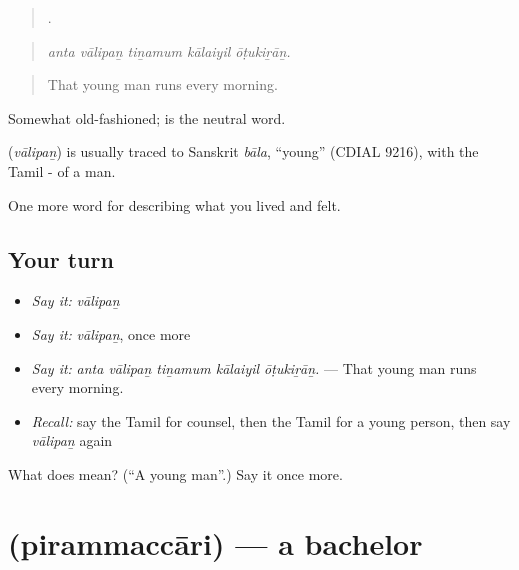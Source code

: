 \begin{quote}
    .
\end{quote}

\begin{quote}
\emph{anta vālipaṉ tiṉamum kālaiyil ōṭukiṟāṉ.}
\end{quote}

\begin{quote}
That young man runs every morning.
\end{quote}

Somewhat old-fashioned;  is the neutral word.

\begin{cousinweb}
\textbf{} (\emph{vālipaṉ}) is usually traced to Sanskrit \emph{bāla}, \textquotedblleft{}young\textquotedblright{} (CDIAL 9216), with the Tamil - of a man.
\end{cousinweb}

\begin{grammarlens}[title={What you've built}]
One more word for describing what you lived and felt.
\end{grammarlens}

\subsection*{Your turn}
\begin{itemize}
\raggedright
  \item \emph{Say it:} \emph{vālipaṉ}
  \item \emph{Say it:} \emph{vālipaṉ}, once more
  \item \emph{Say it:} \emph{anta vālipaṉ tiṉamum kālaiyil ōṭukiṟāṉ.} — That young man runs every morning.
  \item \emph{Recall:} say the Tamil for counsel, then the Tamil for a young person, then say \emph{vālipaṉ} again
\end{itemize}

\begin{tcolorbox}[breakable,colback=teal!4,colframe=teal!35!black,title={Before you move on}]
What does  mean? (\textquotedblleft{}A young man\textquotedblright{}.) Say it once more.
\end{tcolorbox}
\section[\texorpdfstring{\ta{பிரம்மச்சாரி} (pirammaccāri)}{பிரம்மச்சாரி (pirammaccāri)}]{ (pirammaccāri) — a bachelor}

